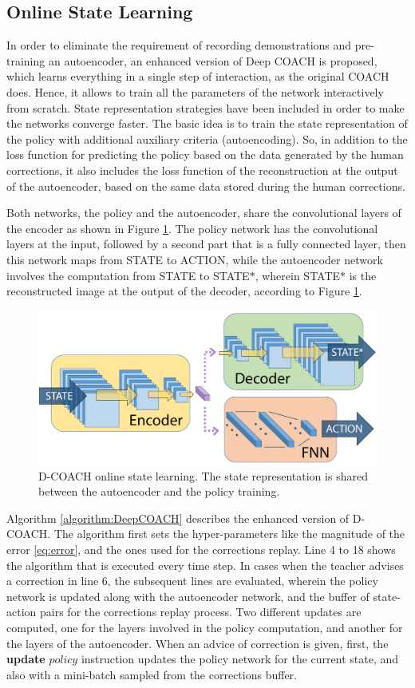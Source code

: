 \subsection{Online State Learning}
In order to eliminate the requirement of recording demonstrations and pre-training an autoencoder, an enhanced version of Deep COACH is proposed, which learns everything in a single step of interaction, as the original COACH does. Hence, it allows to train all the parameters of the network interactively from scratch. State representation strategies have been included in order to make the networks converge faster. The basic idea is to train the state representation of the policy with additional auxiliary criteria (autoencoding). So, in addition to the loss function for predicting the policy based on the data generated by the human corrections, it also includes the loss function of the reconstruction at the output of the autoencoder, based on the same data stored during the human corrections. 

Both networks, the policy and the autoencoder, share the convolutional layers of the encoder as shown in Figure \ref{fig:msim}. The policy network has the convolutional layers at the input, followed by a second part that is a fully connected layer, then this network maps from STATE to ACTION, while the autoencoder network involves the computation from STATE to STATE$*$, wherein  STATE$*$ is the reconstructed image at the output of the decoder, according to Figure \ref{fig:msim}.

\begin{figure}[H]
    \centering
    \includegraphics[width=0.6\linewidth]{imagenes/cap2/m2.pdf}
    \caption{D-COACH online state learning. The state representation is shared between the autoencoder and the policy training.}
    \label{fig:msim}
\end{figure}

Algorithm \ref{algorithm:DeepCOACH} describes the enhanced version of D-COACH. The algorithm first sets the hyper-parameters like the magnitude of the error \eqref{eq:error}, and the ones used for the corrections replay. Line 4 to 18 shows the algorithm that is executed every time step. In cases when the teacher advises a correction in line 6, the subsequent lines are evaluated, wherein the policy network is updated along with the autoencoder network, and the buffer of state-action pairs for the corrections replay process.
Two different updates are computed, one for the layers involved in the policy computation, and another for the layers of the autoencoder. When an advice of correction is given, first, the \textbf{update} $policy$ instruction updates the policy network for the current state, and also with a mini-batch sampled from the corrections buffer. 

